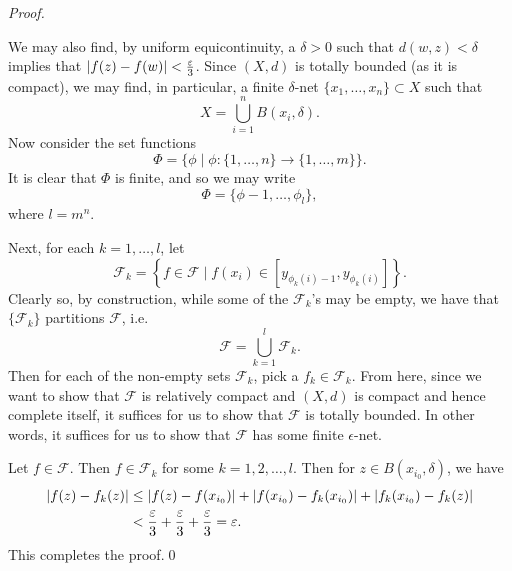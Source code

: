 \documentclass[notoc,notitlepage]{tufte-book}
\begin{document}
\begin{proof}
\begin{marginfigure}
    \caption{Basic Visual Sketch of the Proof of the Arzel\`{a}-Ascoli Theorem}\label{fig:basic_visual_sketch_of_the_proof_of_the_arzela_ascoli_theorem}
  \end{marginfigure}
  We may also find, by uniform equicontinuity, a $\delta > 0$ such that $d(w, z) < \delta$ implies that $\left| f(z) - f(w) \right| < \frac{\varepsilon}{3}$. Since $(X, d)$ is totally bounded (as it is compact), we may find, in particular, a finite $\delta$-net $\{ x_1, \ldots, x_n \} \subset X$ such that
  \begin{equation*}
    X = \bigcup_{i=1}^{n} B(x_i, \delta).
  \end{equation*}
  Now consider the set functions
  \begin{equation*}
    \Phi = \{ \phi \mid \phi : \{ 1, \ldots, n \} \to \{ 1, \ldots, m \} \}.
  \end{equation*}
  It is clear that $\Phi$ is finite, and so we may write
  \begin{equation*}
    \Phi = \{ \phi-1, \ldots, \phi_l \},
  \end{equation*}
  where $l = m^n$.

  Next, for each $k = 1, \ldots, l$, let
  \begin{equation*}
    \mathcal{F}_k = \left\{ f \in \mathcal{F} \mid f(x_i) \in \left[ y_{\phi_k(i) - 1}, y_{\phi_k(i)} \right] \right\}.
  \end{equation*}
  Clearly so, by construction, while some of the $\mathcal{F}_k$'s may be empty, we have that $\{ \mathcal{F}_k \}$ partitions $\mathcal{F}$, i.e.
  \begin{equation*}
    \mathcal{F} = \bigcup_{k=1}^{l} \mathcal{F}_k.
  \end{equation*}
  Then for each of the non-empty sets $\mathcal{F}_k$, pick a $f_k \in \mathcal{F}_k$. From here, since we want to show that $\mathcal{F}$ is relatively compact and $(X, d)$ is compact and hence complete itself, it suffices for us to show that $\mathcal{F}$ is totally bounded. In other words, it suffices for us to show that $\mathcal{F}$ has some finite $\epsilon$-net.

  Let $f \in \mathcal{F}$. Then $f \in \mathcal{F}_k$ for some $k = 1, 2, \ldots, l$. Then for $z \in B(x_{i_0}, \delta)$, we have
  \begin{align*}
    \left| f(z) - f_k(z) \right| &\leq \left| f(z) - f(x_{i_0}) \right| + \left| f(x_{i_0}) - f_k(x_{i_0}) \right| + \left| f_k(x_{i_0}) - f_k(z) \right| \\
                          &< \frac{\varepsilon}{3} + \frac{\varepsilon}{3} + \frac{\varepsilon}{3} = \varepsilon.
  \end{align*}
  This completes the proof.\qed\
\end{proof}
\end{document}
